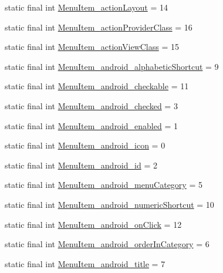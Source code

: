 \begin{CompactItemize}
static final int \hyperlink{classandroid_1_1support_1_1v4_1_1_r_1_1styleable_a796f6f763b1b18c1f30a2dcfb9f5f72}{MenuItem\_\-actionLayout} = 14
\item 
static final int \hyperlink{classandroid_1_1support_1_1v4_1_1_r_1_1styleable_4582e9564c219627c101073b05d99ca3}{MenuItem\_\-actionProviderClass} = 16
\item 
static final int \hyperlink{classandroid_1_1support_1_1v4_1_1_r_1_1styleable_540db8eb18bf4f5b4d829924f23cf3ef}{MenuItem\_\-actionViewClass} = 15
\item 
static final int \hyperlink{classandroid_1_1support_1_1v4_1_1_r_1_1styleable_e18b4d4aaf319c1b053a7a2b6e895ec4}{MenuItem\_\-android\_\-alphabeticShortcut} = 9
\item 
static final int \hyperlink{classandroid_1_1support_1_1v4_1_1_r_1_1styleable_b68a374916d519737c3a28fed80dc49a}{MenuItem\_\-android\_\-checkable} = 11
\item 
static final int \hyperlink{classandroid_1_1support_1_1v4_1_1_r_1_1styleable_2e34104aed0ac276e13e97441de38b68}{MenuItem\_\-android\_\-checked} = 3
\item 
static final int \hyperlink{classandroid_1_1support_1_1v4_1_1_r_1_1styleable_202fdf83a524efca222f4f5d085c0628}{MenuItem\_\-android\_\-enabled} = 1
\item 
static final int \hyperlink{classandroid_1_1support_1_1v4_1_1_r_1_1styleable_2c938bdde9b6c2d73c74e524bd9000a6}{MenuItem\_\-android\_\-icon} = 0
\item 
static final int \hyperlink{classandroid_1_1support_1_1v4_1_1_r_1_1styleable_0d7c59b15e49342fd0002c967ac93807}{MenuItem\_\-android\_\-id} = 2
\item 
static final int \hyperlink{classandroid_1_1support_1_1v4_1_1_r_1_1styleable_4ee75f908e53006cfb8e37bc47033aed}{MenuItem\_\-android\_\-menuCategory} = 5
\item 
static final int \hyperlink{classandroid_1_1support_1_1v4_1_1_r_1_1styleable_a8c445a29006c1bc48e53880a916394f}{MenuItem\_\-android\_\-numericShortcut} = 10
\item 
static final int \hyperlink{classandroid_1_1support_1_1v4_1_1_r_1_1styleable_fa40cc2323bbb032c868308d16e7d64e}{MenuItem\_\-android\_\-onClick} = 12
\item 
static final int \hyperlink{classandroid_1_1support_1_1v4_1_1_r_1_1styleable_7976bdeaae19ffc9069033a5afb3458f}{MenuItem\_\-android\_\-orderInCategory} = 6
\item 
static final int \hyperlink{classandroid_1_1support_1_1v4_1_1_r_1_1styleable_1723212f5e94f798ff04dbfee2d97cf8}{MenuItem\_\-android\_\-title} = 7

\end{CompactItemize}
